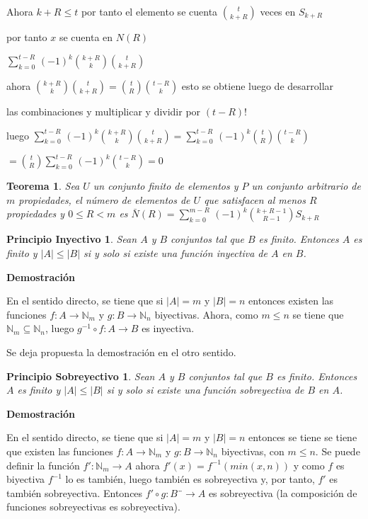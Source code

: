 \documentclass[a4paper,12pt]{report}
\newtheorem*{pin}{Principio Inyectivo}
\newtheorem*{pso}{Principio Sobreyectivo}
\newtheorem*{teo}{Teorema}
\begin{document}
Ahora $k+R\leq t$ por tanto el elemento se cuenta $t\choose{k+R}$ veces en $S_{k+R}$ 

por tanto $x$ se cuenta en $N(R)$
 
$\sum^{t-R}_{k=0}\, (-1)^k$${k+R}\choose{k}$${t}\choose{k+R}$

ahora ${k+R}\choose{k}$${t}\choose{k+R}$$=$${t}\choose{R}$${t-R}\choose{k}$ esto se obtiene luego de desarrollar 

las combinaciones y multiplicar y dividir por $(t-R)!$

luego $\sum^{t-R}_{k=0}\, (-1)^k$${k+R}\choose{k}$${t}\choose{k+R}$$=$$\sum^{t-R}_{k=0}\, (-1)^k$${t}\choose{R}$${t-R}\choose{k}$

$=$${t}\choose{R}$$\sum^{t-R}_{k=0}\, (-1)^k$${t-R}\choose{k}$$=0$

\begin{teo}
  Sea $U$ un conjunto finito de elementos y $P$ un conjunto arbitrario de $m$ propiedades, el número de elementos de $U$ que satisfacen al menos $R$ propiedades y $0\leq R < m$ es
 $\bar{N}(R) = \sum^{m-R}_{k=0}\, (-1)^k$${k+R-1}\choose{R-1}$$S_{k+R}$
\end{teo}

\begin{pin}
 Sean $A$ y $B$ conjuntos tal que $B$ es finito. Entonces $A$ es finito y $|A|\leq|B|$ si y solo si existe una función inyectiva de $A$ en $B$.
\end{pin}

\textbf{Demostración}

En el sentido directo, se tiene que si $|A|=m$ y $|B|=n$ entonces existen las funciones $f:A\rightarrow\mathbb{N}_m$ y $g:B\rightarrow\mathbb{N}_n$ biyectivas. Ahora, como $m\leq n$ se tiene que $\mathbb{N}_m\subseteq\mathbb{N}_n$, luego $g^{-1}\circ f:A\rightarrow B$ es inyectiva.

Se deja propuesta la demostración en el otro sentido. 

\begin{pso}
 Sean $A$ y $B$ conjuntos tal que $B$ es finito. Entonces $A$ es finito y $|A|\leq|B|$ si y solo si existe una función sobreyectiva de $B$ en $A$.
\end{pso}

\textbf{Demostración}

En el sentido directo, se tiene que si $|A|=m$ y $|B|=n$ entonces se tiene se tiene que existen las funciones $f:A\rightarrow\mathbb{N}_m$ y $g:B\rightarrow\mathbb{N}_n$ biyectivas, con $m\leq n$. Se puede definir la función $f':\mathbb{N}_m\rightarrow A$ ahora $f'(x)=f^{-1}(min(x,n))$ y como $f$ es biyectiva $f^{-1}$ lo es también, luego también es sobreyectiva y, por tanto, $f'$ es también sobreyectiva. Entonces $f'\circ g:B¨\rightarrow A$ es sobreyectiva (la composición de funciones sobreyectivas es sobreyectiva).
\end{document}
